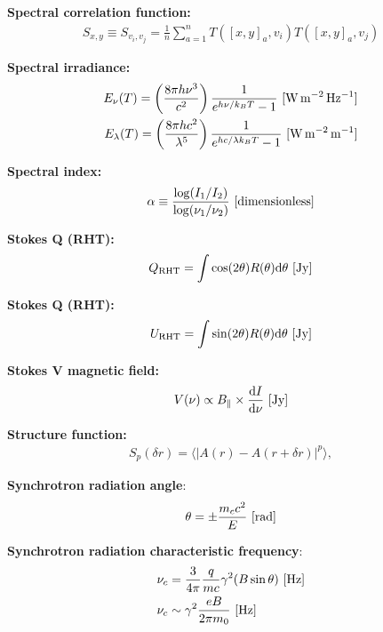 \documentclass[a4paper,10pt]{article}
\begin{document}
{\noindent}\textbf{Spectral correlation function:}
\begin{align*}
    S_{x,y} \equiv S_{v_i,v_j} = \frac{1}{n}\sum_{a=1}^n T([x,y]_a,v_i)T([x,y]_a,v_j)
\end{align*}

{\noindent}\textbf{Spectral irradiance:}
\begin{align*}
    E_\nu(T) = \left(\frac{8\pi h\nu^3}{c^2}\right) \frac{1}{e^{h\nu/k_BT}-1} ~ [{\rm W\,m^{-2}\,Hz^{-1}}] \\
    E_\lambda(T) = \left(\frac{8\pi hc^2}{\lambda^5}\right) \frac{1}{e^{hc/\lambda k_BT}-1} ~ [{\rm W\,m^{-2}\,m^{-1}}]
\end{align*}

{\noindent}\textbf{Spectral index:}
\begin{align*}
    \alpha \equiv \frac{\log(I_1/I_2)}{\log(\nu_1/\nu_2)} ~ [{\rm dimensionless}]
\end{align*}

{\noindent}\textbf{Stokes Q (RHT):}
\begin{align*}
    Q_\mathrm{RHT} = \int\cos(2\theta)R(\theta)\mathrm{d}\theta ~ [{\rm Jy}]
\end{align*}

{\noindent}\textbf{Stokes Q (RHT):}
\begin{align*}
    U_\mathrm{RHT} = \int\sin(2\theta)R(\theta)\mathrm{d}\theta ~ [{\rm Jy}]
\end{align*}

{\noindent}\textbf{Stokes V magnetic field:}
\begin{align*}
    V(\nu) \propto B_\parallel \times \frac{\mathrm{d}I}{\mathrm{d}\nu} ~ [\rm Jy]
\end{align*}

{\noindent}\textbf{Structure function:}
\begin{align*}
    S_p(\delta r) = \langle\lvert A(r)-A(r+\delta r)\rvert^p\rangle,
\end{align*}

{\noindent}\textbf{Synchrotron radiation angle}:
\begin{align*}
\theta = \pm \frac{m_cc^2}{E} ~ [\rm rad]
\end{align*}

{\noindent}\textbf{Synchrotron radiation characteristic frequency}:
\begin{align*}
\nu_c &= \dfrac{3}{4\pi}\dfrac{q}{mc}\gamma^2(B\sin\theta)~[{\rm Hz}] \\
\nu_c &\sim \gamma^2 \frac{eB}{2\pi m_0} ~ [{\rm Hz}]
\end{align*}
\end{document}
